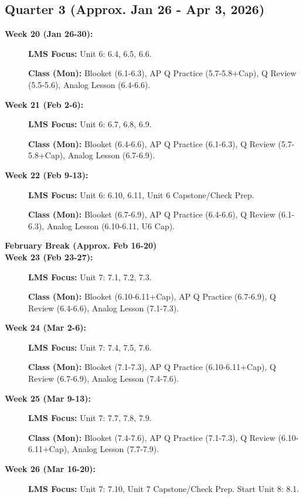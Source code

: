 \documentclass[11pt]{article}
\begin{document}
\subsection*{\textcolor{lynnmaroon}{Quarter 3 (Approx. Jan 26 - Apr 3, 2026)}}

\begin{description}
  \item[\textbf{Week 20 (Jan 26-30):}] \textbf{LMS Focus:} Unit 6: 6.4, 6.5, 6.6.
  
  \textbf{Class (Mon):} Blooket (6.1-6.3), AP Q Practice (5.7-5.8+Cap), Q Review (5.5-5.6), Analog Lesson (6.4-6.6).
  
  \item[\textbf{Week 21 (Feb 2-6):}] \textbf{LMS Focus:} Unit 6: 6.7, 6.8, 6.9.
  
  \textbf{Class (Mon):} Blooket (6.4-6.6), AP Q Practice (6.1-6.3), Q Review (5.7-5.8+Cap), Analog Lesson (6.7-6.9).
  
  \item[\textbf{Week 22 (Feb 9-13):}] \textbf{LMS Focus:} Unit 6: 6.10, 6.11, Unit 6 Capstone/Check Prep.
  
  \textbf{Class (Mon):} Blooket (6.7-6.9), AP Q Practice (6.4-6.6), Q Review (6.1-6.3), Analog Lesson (6.10-6.11, U6 Cap).
  
  \item[\textbf{February Break (Approx. Feb 16-20)}]
  
  \item[\textbf{Week 23 (Feb 23-27):}] \textbf{LMS Focus:} Unit 7: 7.1, 7.2, 7.3.
  
  \textbf{Class (Mon):} Blooket (6.10-6.11+Cap), AP Q Practice (6.7-6.9), Q Review (6.4-6.6), Analog Lesson (7.1-7.3).
  
  \item[\textbf{Week 24 (Mar 2-6):}] \textbf{LMS Focus:} Unit 7: 7.4, 7.5, 7.6.
  
  \textbf{Class (Mon):} Blooket (7.1-7.3), AP Q Practice (6.10-6.11+Cap), Q Review (6.7-6.9), Analog Lesson (7.4-7.6).
  
  \item[\textbf{Week 25 (Mar 9-13):}] \textbf{LMS Focus:} Unit 7: 7.7, 7.8, 7.9.
  
  \textbf{Class (Mon):} Blooket (7.4-7.6), AP Q Practice (7.1-7.3), Q Review (6.10-6.11+Cap), Analog Lesson (7.7-7.9).
  
  \item[\textbf{Week 26 (Mar 16-20):}] \textbf{LMS Focus:} Unit 7: 7.10, Unit 7 Capstone/Check Prep. Start Unit 8: 8.1.
  

\end{description}
\end{document}
